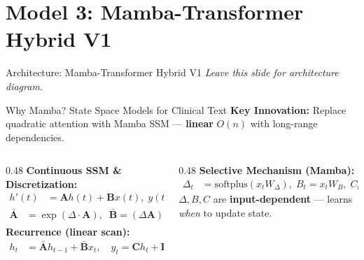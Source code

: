 \documentclass[10pt, aspectratio=169]{beamer}
\begin{document}
\section{Model 3: Mamba-Transformer Hybrid V1}

\begin{frame}{Architecture: Mamba-Transformer Hybrid V1}
  \vspace{-0.2cm}
  {\small \textit{Leave this slide for architecture diagram.}}
\end{frame}

\begin{frame}{Why Mamba? State Space Models for Clinical Text}
  \vspace{-0.2cm}
  {\footnotesize\textbf{Key Innovation:} Replace quadratic attention with Mamba SSM --- \textbf{linear} $O(n)$ with long-range dependencies.}

  \vspace{0.05cm}
  \footnotesize
  \begin{columns}[T]
    \begin{column}{0.48\textwidth}
      \textbf{Continuous SSM \& Discretization:}
      \vspace{-0.2cm}
      \begin{align}
        h'(t) &= \mathbf{A} h(t) + \mathbf{B} x(t), \; y(t) = \mathbf{C} h(t) \nonumber
      \end{align}
      \vspace{-0.4cm}
      \begin{align}
        \bar{\mathbf{A}} &= \exp(\Delta {\cdot} \mathbf{A}), \;\; \bar{\mathbf{B}} = (\Delta \mathbf{A})^{-1}(e^{\Delta \mathbf{A}} {-} \mathbf{I}) \Delta \mathbf{B} \nonumber
      \end{align}
      \vspace{-0.2cm}
      \textbf{Recurrence (linear scan):}
      \vspace{-0.2cm}
      \begin{align}
        h_t &= \bar{\mathbf{A}} h_{t-1} + \bar{\mathbf{B}} x_t, \quad y_t = \mathbf{C} h_t + \mathbf{D} x_t \nonumber
      \end{align}
    \end{column}
    \begin{column}{0.48\textwidth}
      \textbf{Selective Mechanism (Mamba):}
      \vspace{-0.2cm}
      \begin{align}
        \Delta_t &= \text{softplus}(x_t W_\Delta), \; B_t = x_t W_B, \; C_t = x_t W_C \nonumber
      \end{align}
      \vspace{-0.3cm}
      {\scriptsize $\Delta, B, C$ are \textbf{input-dependent} --- learns \emph{when} to update state.}


\end{column}
\end{columns}
\end{frame}
\end{document}
